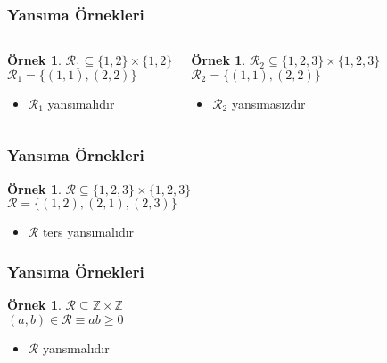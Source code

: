 \documentclass[dvipsnames]{beamer}
\theoremstyle{definition}
\theoremstyle{example}
\newtheorem{ornek}[theorem]{Örnek}
\theoremstyle{plain}
\begin{document}
\begin{frame}
  \frametitle{Yansıma Örnekleri}

  \begin{columns}[t]
    \begin{ornek}
      $\mathcal{R}_1 \subseteq \{1,2\} \times \{1,2\}$\\
      $\mathcal{R}_1 = \{(1,1), (2,2)\}$

      \medskip
      \begin{itemize}
        \item $\mathcal{R}_1$ yansımalıdır
      \end{itemize}
    \end{ornek}

    \pause
    \begin{ornek}
      $\mathcal{R}_2 \subseteq \{1,2,3\} \times \{1,2,3\}$\\
      $\mathcal{R}_2 = \{(1,1), (2,2)\}$

      \medskip
      \begin{itemize}
        \item $\mathcal{R}_2$ yansımasızdır
      \end{itemize}
    \end{ornek}
  \end{columns}
\end{frame}

\begin{frame}
  \frametitle{Yansıma Örnekleri}

  \begin{ornek}
    $\mathcal{R} \subseteq \{1,2,3\} \times \{1,2,3\}$\\
    $\mathcal{R} = \{(1,2), (2,1), (2,3)\}$

    \medskip
    \begin{itemize}
      \item $\mathcal{R}$ ters yansımalıdır
    \end{itemize}
  \end{ornek}
\end{frame}

\begin{frame}
  \frametitle{Yansıma Örnekleri}

  \begin{ornek}
    $\mathcal{R} \subseteq \mathbb{Z} \times \mathbb{Z}$\\
    $(a,b) \in \mathcal{R} \equiv ab \geq 0$

    \medskip
    \begin{itemize}
      \item $\mathcal{R}$ yansımalıdır
    \end{itemize}
  \end{ornek}
\end{frame}
\end{document}
